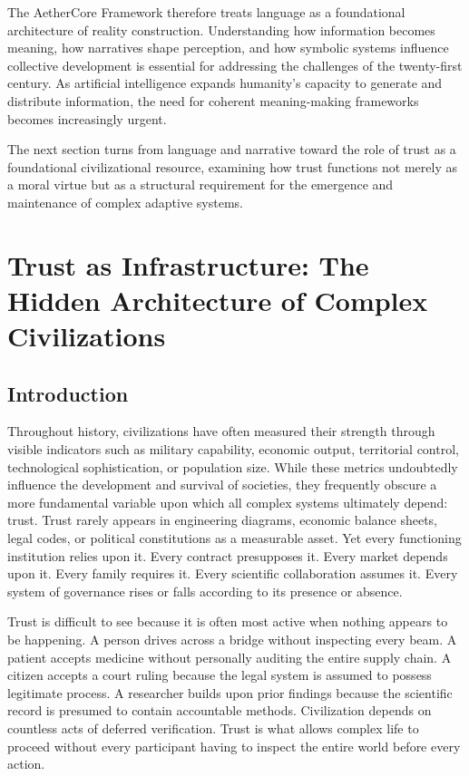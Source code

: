 \documentclass[12pt]{article}
\begin{document}
The AetherCore Framework therefore treats language as a foundational architecture of reality construction. Understanding how information becomes meaning, how narratives shape perception, and how symbolic systems influence collective development is essential for addressing the challenges of the twenty-first century. As artificial intelligence expands humanity's capacity to generate and distribute information, the need for coherent meaning-making frameworks becomes increasingly urgent.

The next section turns from language and narrative toward the role of trust as a foundational civilizational resource, examining how trust functions not merely as a moral virtue but as a structural requirement for the emergence and maintenance of complex adaptive systems.

\section{Trust as Infrastructure: The Hidden Architecture of Complex Civilizations}

\subsection{Introduction}

Throughout history, civilizations have often measured their strength through visible indicators such as military capability, economic output, territorial control, technological sophistication, or population size. While these metrics undoubtedly influence the development and survival of societies, they frequently obscure a more fundamental variable upon which all complex systems ultimately depend: trust. Trust rarely appears in engineering diagrams, economic balance sheets, legal codes, or political constitutions as a measurable asset. Yet every functioning institution relies upon it. Every contract presupposes it. Every market depends upon it. Every family requires it. Every scientific collaboration assumes it. Every system of governance rises or falls according to its presence or absence.

Trust is difficult to see because it is often most active when nothing appears to be happening. A person drives across a bridge without inspecting every beam. A patient accepts medicine without personally auditing the entire supply chain. A citizen accepts a court ruling because the legal system is assumed to possess legitimate process. A researcher builds upon prior findings because the scientific record is presumed to contain accountable methods. Civilization depends on countless acts of deferred verification. Trust is what allows complex life to proceed without every participant having to inspect the entire world before every action.
\end{document}

